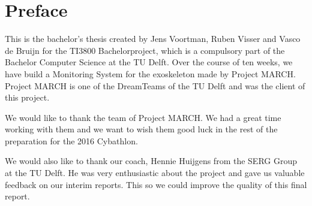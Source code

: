 \chapter*{Preface}
This is the bachelor’s thesis created by Jens Voortman, Ruben Visser and Vasco de Bruijn for the TI3800 Bachelorproject, which is a compulsory part of the Bachelor Computer Science at the TU Delft. Over the course of ten weeks, we have build a Monitoring System for the exoskeleton made by Project MARCH. Project MARCH is one of the DreamTeams of the TU Delft and was the client of this project.

We would like to thank the team of Project MARCH. We had a great time working with them and we want to wish them good luck in the rest of the preparation for the 2016 Cybathlon.

We would also like to thank our coach, Hennie Huijgens from the SERG Group at the TU Delft. He was very enthusiastic about the project and gave us valuable feedback on our interim reports. This so we could improve the quality of this final report. 